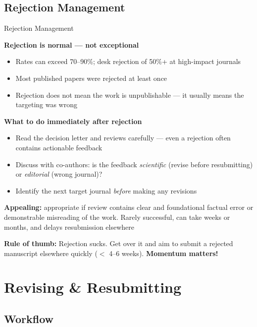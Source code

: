 \documentclass{beamer}
\begin{document}
\subsection{Rejection Management}

\begin{frame}{Rejection Management}

  \footnotesize
  \textbf{Rejection is normal --- not exceptional}
  \begin{itemize}
    \item Rates can exceed 70--90\%; desk rejection of 50\%+ at high-impact journals
    \item Most published papers were rejected at least once
    \item Rejection does not mean the work is unpublishable ---
      it usually means the targeting was wrong
  \end{itemize}

  \medskip
  \textbf{What to do immediately after rejection}
  \begin{itemize}
    \item Read the decision letter and reviews carefully ---
      even a rejection often contains actionable feedback
    \item Discuss with co-authors: is the feedback
      \emph{scientific} (revise before resubmitting) or
      \emph{editorial} (wrong journal)?
    \item Identify the next target journal \emph{before}
      making any revisions
  \end{itemize}

  \medskip
  \textbf{Appealing:} 
      appropriate if review contains clear and foundational factual error
      or demonstrable misreading of the work.
      Rarely successful, can take weeks
      or months, and delays resubmission elsewhere

  \medskip
  \alert{\textbf{Rule of thumb:}} 
  Rejection sucks.  
  Get over it and aim to submit a rejected manuscript elsewhere quickly ($<$ 4--6 weeks). 
  \textbf{Momentum matters!}

\end{frame}



\section{Revising \& Resubmitting}

\subsection{Workflow}
\end{document}
